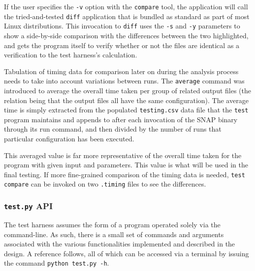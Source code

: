 \documentclass[conference]{IEEEtran}
\begin{document}
If the user specifies the \texttt{-v} option with the \texttt{compare} tool, the application will call the tried-and-tested \texttt{diff} application that is bundled as standard as part of most Linux distributions. This invocation to \texttt{diff} uses the \texttt{-s} and \texttt{-y} parameters to show a side-by-side comparison with the differences between the two highlighted, and gets the program itself to verify whether or not the files are identical as a verification to the test harness's calculation.

Tabulation of timing data for comparison later on during the analysis process needs to take into account variations between runs. The \texttt{average} command was introduced to average the overall time taken per group of related output files (the relation being that the output files all have the same configuration). The average time is simply extracted from the populated \texttt{testing.csv} data file that the \texttt{test} program maintains and appends to after each invocation of the SNAP binary through its run command, and then divided by the number of runs that particular configuration has been executed.

This averaged value is far more representative of the overall time taken for the program with given input and parameters. This value is what will be used in the final testing. If more fine-grained comparison of the timing data is needed, \texttt{test compare} can be invoked on two \texttt{.timing} files to see the differences.


\subsubsection{\texttt{test.py} API}
\label{subsubsec:testapi}

The test harness assumes the form of a program operated solely via the command-line. As such, there is a small set of commands and arguments associated with the various functionalities implemented and described in the design. A reference follows, all of which can be accessed via a terminal by issuing the command \texttt{python test.py -h}.
\end{document}
